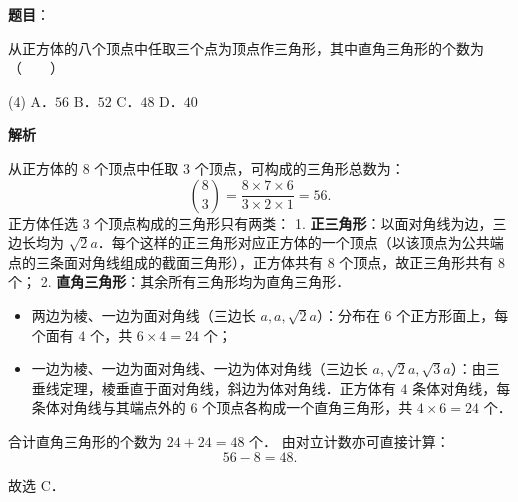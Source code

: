 \begin{answer}

\textbf{题目}：

从正方体的八个顶点中任取三个点为顶点作三角形，其中直角三角形的个数为\mbox{（　　）}

\begin{gkopts}(4)
\task A．$56$
\task B．$52$
\task C．$48$
\task D．$40$
\end{gkopts}

\textbf{解析}

从正方体的 $8$ 个顶点中任取 $3$ 个顶点，可构成的三角形总数为：
\nopagebreak[4]
\[
\binom{8}{3} = \frac{8 \times 7 \times 6}{3 \times 2 \times 1} = 56.
\]
正方体任选 $3$ 个顶点构成的三角形只有两类：
1. \textbf{正三角形}：以面对角线为边，三边长均为 $\sqrt{2}a$．每个这样的正三角形对应正方体的一个顶点（以该顶点为公共端点的三条面对角线组成的截面三角形），正方体共有 $8$ 个顶点，故正三角形共有 $8$ 个；
2. \textbf{直角三角形}：其余所有三角形均为直角三角形．
\begin{itemize}
\item 两边为棱、一边为面对角线（三边长 $a, a, \sqrt{2}a$）：分布在 $6$ 个正方形面上，每个面有 $4$ 个，共 $6 \times 4 = 24$ 个；
\item 一边为棱、一边为面对角线、一边为体对角线（三边长 $a, \sqrt{2}a, \sqrt{3}a$）：由三垂线定理，棱垂直于面对角线，斜边为体对角线．正方体有 $4$ 条体对角线，每条体对角线与其端点外的 $6$ 个顶点各构成一个直角三角形，共 $4 \times 6 = 24$ 个．
\end{itemize}
   合计直角三角形的个数为 $24 + 24 = 48$ 个．
由对立计数亦可直接计算：
\nopagebreak[4]
\[
56 - 8 = 48.
\]

故选 C．


\end{answer}
